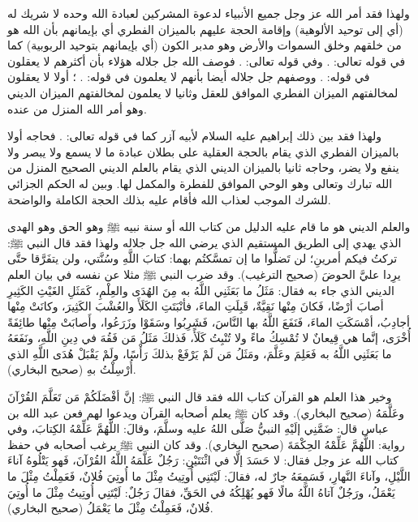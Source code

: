 ولهذا فقد أمر الله عز وجل جميع الأنبياء لدعوة المشركين لعبادة الله وحده لا شريك له (أي إلى توحيد الألوهية) وإقامة الحجة عليهم بالميزان الفطري أي بإيمانهم بأن الله هو من خلقهم وخلق السموات والأرض وهو مدبر الكون (أي بإيمانهم بتوحيد الربوبية) كما في قوله تعالى:
\quranayah*[39][38]{\footnotesize \surahname*[39]}.
وفي قوله تعالى: 
\quranayah*[43][87]{\footnotesize \surahname*[43]}. فوصف الله جل جلاله هؤلاء بأن أكثرهم لا يعقلون في قوله:
\quranayah*[29][63]{\footnotesize \surahname*[29]}.
ووصفهم جل جلاله أيضا بأنهم لا يعلمون في قوله:
\quranayah*[31][25]{\footnotesize \surahname*[31]}.
؛ أولا لا يعقلون لمخالفتهم الميزان الفطري الموافق للعقل وثانيا لا يعلمون لمخالفتهم الميزان الديني وهو أمر الله المنزل من عنده. 

ولهذا فقد بين ذلك إبراهيم عليه السلام لأبيه آزر كما في قوله تعالى:
\quranayah*[19][42-45]{\footnotesize \surahname*[19]}. فحاجه أولا بالميزان الفطري الذي يقام بالحجة العقلية على بطلان عبادة ما لا يسمع ولا يبصر ولا ينفع ولا يضر، وحاجه ثانيا بالميزان الديني الذي يقام بالعلم الديني الصحيح المنزل من الله تبارك وتعالى وهو الوحي الموافق للفطرة والمكمل لها. وبين له الحكم الجزائي للشرك الموجب لعذاب الله فأقام عليه بذلك الحجة الكاملة والواضحة. 

والعلم الديني هو ما قام عليه الدليل من كتاب الله أو سنة نبيه ﷺ وهو الحق وهو الهدى الذي يهدي إلى الطريق المستقيم الذي يرضي الله جل جلاله ولهذا فقد قال النبي ﷺ: تركتُ فيكم أمرينِ؛ لن تَضلُّوا ما إن تمسَّكتُم بهما: كتابَ اللَّهِ وسُنَّتي، ولن يتفَرَّقا حتَّى يرِدا عليَّ الحوضَ {\footnotesize (صحيح الترغيب)}. وقد ضرب النبي ﷺ مثلا عن نفسه في بيان العلم الديني الذي جاء به فقال: مَثَلُ ما بَعَثَنِي اللَّهُ به مِنَ الهُدَى والعِلْمِ، كَمَثَلِ الغَيْثِ الكَثِيرِ أصابَ أرْضًا، فَكانَ مِنْها نَقِيَّةٌ، قَبِلَتِ الماءَ، فأنْبَتَتِ الكَلَأَ والعُشْبَ الكَثِيرَ، وكانَتْ مِنْها أجادِبُ، أمْسَكَتِ الماءَ، فَنَفَعَ اللَّهُ بها النَّاسَ، فَشَرِبُوا وسَقَوْا وزَرَعُوا، وأَصابَتْ مِنْها طائِفَةً أُخْرَى، إنَّما هي قِيعانٌ لا تُمْسِكُ ماءً ولا تُنْبِتُ كَلَأً، فَذلكَ مَثَلُ مَن فَقُهَ في دِينِ اللَّهِ، ونَفَعَهُ ما بَعَثَنِي اللَّهُ به فَعَلِمَ وعَلَّمَ، ومَثَلُ مَن لَمْ يَرْفَعْ بذلكَ رَأْسًا، ولَمْ يَقْبَلْ هُدَى اللَّهِ الذي أُرْسِلْتُ بهِ {\footnotesize (صحيح البخاري)}.

 وخير هذا العلم هو القرآن كتاب الله فقد قال النبي ﷺ: إنَّ أفْضَلَكُمْ مَن تَعَلَّمَ القُرْآنَ وعَلَّمَهُ {\footnotesize (صحيح البخاري)}. وقد كان ﷺ يعلم أصحابه القرآن ويدعوا لهم فعن عبد الله بن عباس قال: ضَمَّنِي إلَيْهِ النبيُّ صَلَّى اللهُ عليه وسلَّمَ، وقالَ: اللَّهُمَّ عَلِّمْهُ الكِتابَ، وفي رواية: اللَّهُمَّ عَلِّمْهُ الحِكْمَةَ {\footnotesize (صحيح البخاري)}. وقد كان النبي ﷺ يرغب أصحابه في حفظ كتاب الله عز وجل فقال: لا حَسَدَ إلَّا في اثْنَتَيْنِ: رَجُلٌ عَلَّمَهُ اللَّهُ القُرْآنَ، فَهو يَتْلُوهُ آناءَ اللَّيْلِ، وآناءَ النَّهارِ، فَسَمِعَهُ جارٌ له، فقالَ: لَيْتَنِي أُوتِيتُ مِثْلَ ما أُوتِيَ فُلانٌ، فَعَمِلْتُ مِثْلَ ما يَعْمَلُ، ورَجُلٌ آتاهُ اللَّهُ مالًا فَهو يُهْلِكُهُ في الحَقِّ، فقالَ رَجُلٌ: لَيْتَنِي أُوتِيتُ مِثْلَ ما أُوتِيَ فُلانٌ، فَعَمِلْتُ مِثْلَ ما يَعْمَلُ {\footnotesize (صحيح البخاري)}.

